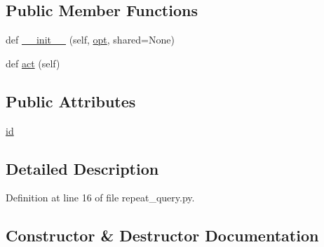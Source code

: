 \subsection*{Public Member Functions}
\begin{DoxyCompactItemize}
\item 
def \hyperlink{classparlai_1_1agents_1_1repeat__query_1_1repeat__query_1_1RepeatQueryAgent_a1ebfe807ecdf068282d681b5047b035a}{\+\_\+\+\_\+init\+\_\+\+\_\+} (self, \hyperlink{classparlai_1_1core_1_1agents_1_1Agent_ab3b45d2754244608c75d4068b90cd051}{opt}, shared=None)
\item 
def \hyperlink{classparlai_1_1agents_1_1repeat__query_1_1repeat__query_1_1RepeatQueryAgent_a7db5db4eda3e033a9022a4f4fe74419b}{act} (self)
\end{DoxyCompactItemize}
\subsection*{Public Attributes}
\begin{DoxyCompactItemize}
\item 
\hyperlink{classparlai_1_1agents_1_1repeat__query_1_1repeat__query_1_1RepeatQueryAgent_ab6fbd1dbd2b197d0ab72d3f9f11c9d8a}{id}
\end{DoxyCompactItemize}


\subsection{Detailed Description}


Definition at line 16 of file repeat\+\_\+query.\+py.



\subsection{Constructor \& Destructor Documentation}
\mbox{\label{classparlai_1_1agents_1_1repeat__query_1_1repeat__query_1_1RepeatQueryAgent_a1ebfe807ecdf068282d681b5047b035a}} 
